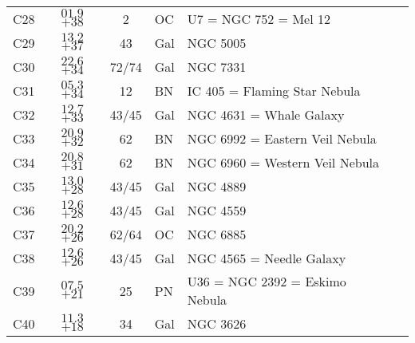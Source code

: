 \begin{table}[p]
\begin{tabular}{lcclll}
C28  &$01.9$ $+38$&2&OC &U7 = NGC 752 = Mel 12\\
C29  &$13.2$ $+37$&43&Gal&NGC 5005\\
C30  &$22.6$ $+34$&72/74&Gal&NGC 7331\\
C31  &$05.3$ $+34$&12&BN &IC 405 = Flaming Star Nebula\\
C32  &$12.7$ $+33$&43/45&Gal&NGC 4631 = Whale Galaxy\\
C33  &$20.9$ $+32$&62&BN &NGC 6992 = Eastern Veil Nebula\\
C34  &$20.8$ $+31$&62&BN &NGC 6960 = Western Veil Nebula\\
C35  &$13.0$ $+28$&43/45&Gal&NGC 4889\\
C36  &$12.6$ $+28$&43/45&Gal&NGC 4559\\
C37  &$20.2$ $+26$&62/64&OC &NGC 6885\\
C38  &$12.6$ $+26$&43/45&Gal&NGC 4565 = Needle Galaxy\\
C39  &$07.5$ $+21$&25&PN &U36 = NGC 2392 = Eskimo Nebula\\
C40  &$11.3$ $+18$&34&Gal&NGC 3626\\
\hline
\end{tabular}
\end{table}

